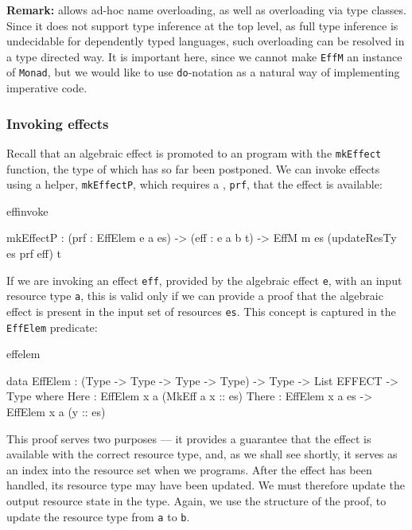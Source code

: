 \textbf{Remark:} \Idris{} allows ad-hoc name overloading, as well as overloading via type classes.
Since it does not support type inference at the top level, as full type inference
is undecidable for dependently typed languages, such overloading can be
resolved in a type directed way.
It is important here, since we cannot make
\texttt{EffM} an instance of \texttt{Monad}, but we would like to use
\texttt{do}-notation as a natural way of implementing imperative code.

\subsubsection{Invoking effects}

Recall that an algebraic effect is promoted to an \Eff{} program 
with the \texttt{mkEffect} function, the type of which has so far
been postponed. We can invoke effects using a helper, \texttt{mkEffectP}, which
requires a , \texttt{prf},
that the effect 
is available:

\begin{SaveVerbatim}{effinvoke}

mkEffectP : (prf : EffElem e a es) -> 
            (eff : e a b t) -> 
            EffM m es (updateResTy es prf eff) t

\end{SaveVerbatim}

\noindent
If we are invoking an effect \texttt{eff}, provided by the algebraic effect
\texttt{e}, with an input resource type \texttt{a},
this is valid only if we can provide a proof that the algebraic effect is
present in the input set of resources \texttt{es}. This concept is captured
in the \texttt{EffElem} predicate:

\begin{SaveVerbatim}{effelem}

data EffElem : (Type -> Type -> Type -> Type) -> 
               Type -> List EFFECT -> Type where
     Here : EffElem x a (MkEff a x :: es)
     There : EffElem x a es -> EffElem x a (y :: es)

\end{SaveVerbatim}

\noindent
This proof serves two purposes --- it provides a guarantee that the effect
is available with the correct resource type, and, as we shall see shortly,
it serves as an index into the resource set when we  programs.
%
After the effect has been handled, its resource type may have been updated.
We must therefore update the output resource state in the type. Again, we use
the structure of the proof, to update the resource type from \texttt{a} to
\texttt{b}.

